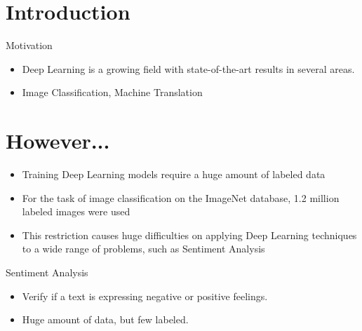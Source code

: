 \documentclass[10pt]{beamer}
\begin{document}
\maketitle

\section{Introduction}

\begin{frame}[fragile]{Motivation}
\begin{itemize}
\item \alert{Deep Learning} is a growing field with state-of-the-art results in
    several areas.
\vspace{0.5cm}
\item Image Classification, Machine Translation
\end{itemize}
\end{frame}

\section{However...}

\begin{frame}[fragile]
\begin{itemize}
\item Training \alert{Deep Learning} models require a huge amount of labeled data
\vspace{0.5cm}
\item For the task of image classification on the ImageNet database, 1.2 million
    labeled images were used \cite{imagenet}
\vspace{0.5cm}
\item This restriction causes huge difficulties on applying Deep Learning
    techniques to a wide range of problems, such as \alert{Sentiment Analysis}
\end{itemize}
\end{frame}

\begin{frame}[fragile]{Sentiment Analysis}
\begin{itemize}
\item Verify if a text is expressing negative or positive feelings.
\vspace{0.5cm}
\item Huge amount of data, but few labeled.
\end{itemize}
\end{frame}
\end{document}
